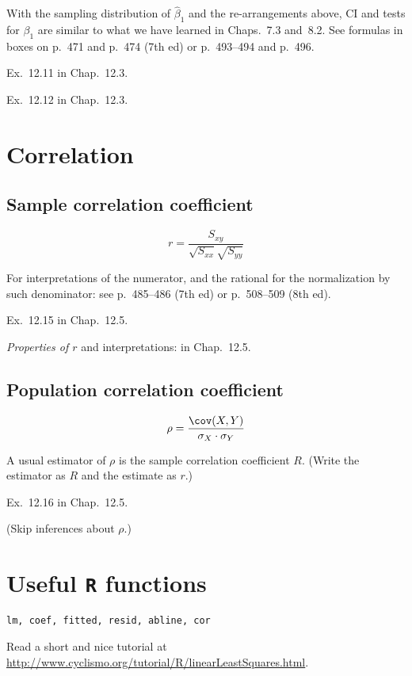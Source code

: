 \documentclass[12pt]{article}
\begin{document}
With the sampling distribution of $\hat{\beta}_1$
and the re-arrangements above,
CI and tests for $\beta_1$ are similar to what we have learned
in Chaps.~7.3 and~8.2.
See formulas in boxes on p.~471 and p.~474 (7th ed) or
p.~493--494 and p.~496.

\example Ex.~12.11 in Chap.~12.3.

\example Ex.~12.12 in Chap.~12.3.

\section{Correlation}

\subsection{Sample correlation coefficient}

%
\[
r = \frac{S_{xy}}{\sqrt{S_{xx}}\sqrt{S_{yy}}}
\]

For interpretations of the numerator,
and the rational for the normalization by such denominator:
see p.~485--486 (7th ed) or p.~508--509 (8th ed).

\example
Ex.~12.15 in Chap.~12.5.

\emph{Properties of $r$} and interpretations:
in Chap.~12.5.


\subsection{Population correlation coefficient}

\[
\rho = \frac{\cov(X,Y)}{\sigma_X\cdot \sigma_Y}
\]

A usual estimator of $\rho$ is the sample correlation coefficient $R$.
(Write the estimator as $R$ and the estimate as $r$.)

\example
Ex.~12.16 in Chap.~12.5.

(Skip inferences about $\rho$.)

\section{Useful \texttt{R} functions}

\texttt{lm, coef, fitted, resid, abline, cor}

Read a short and nice tutorial at
\url{http://www.cyclismo.org/tutorial/R/linearLeastSquares.html}.
\end{document}
